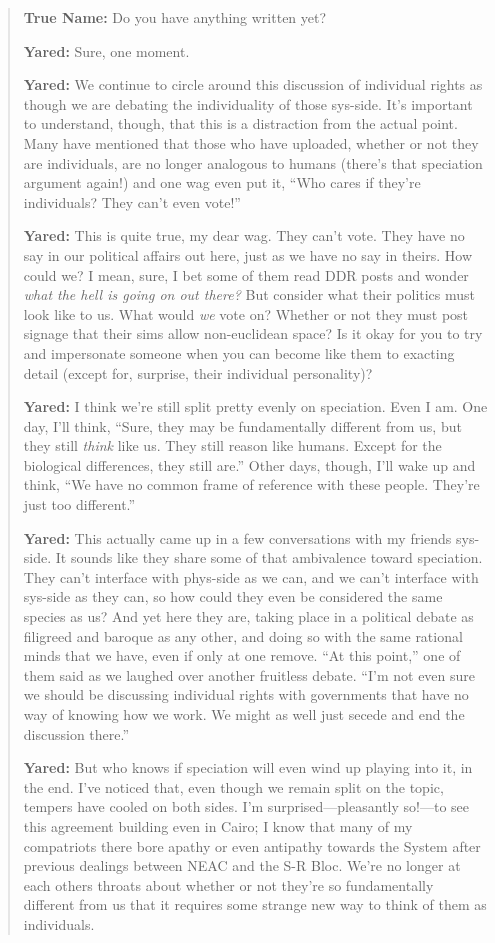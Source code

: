 \begin{quote}
\textbf{True Name:} Do you have anything written yet?

\textbf{Yared:} Sure, one moment.

\textbf{Yared:} We continue to circle around this discussion of individual rights as though we are debating the individuality of those sys-side. It's important to understand, though, that this is a distraction from the actual point. Many have mentioned that those who have uploaded, whether or not they are individuals, are no longer analogous to humans (there's that speciation argument again!) and one wag even put it, ``Who cares if they're individuals? They can't even vote!''

\textbf{Yared:} This is quite true, my dear wag. They can't vote. They have no say in our political affairs out here, just as we have no say in theirs. How could we? I mean, sure, I bet some of them read DDR posts and wonder \emph{what the hell is going on out there?} But consider what their politics must look like to us. What would \emph{we} vote on? Whether or not they must post signage that their sims allow non-euclidean space? Is it okay for you to try and impersonate someone when you can become like them to exacting detail (except for, surprise, their individual personality)?

\textbf{Yared:} I think we're still split pretty evenly on speciation. Even I am. One day, I'll think, ``Sure, they may be fundamentally different from us, but they still \emph{think} like us. They still reason like humans. Except for the biological differences, they still are.'' Other days, though, I'll wake up and think, ``We have no common frame of reference with these people. They're just too different.''

\textbf{Yared:} This actually came up in a few conversations with my friends sys-side. It sounds like they share some of that ambivalence toward speciation. They can't interface with phys-side as we can, and we can't interface with sys-side as they can, so how could they even be considered the same species as us? And yet here they are, taking place in a political debate as filigreed and baroque as any other, and doing so with the same rational minds that we have, even if only at one remove. ``At this point,'' one of them said as we laughed over another fruitless debate. ``I'm not even sure we should be discussing individual rights with governments that have no way of knowing how we work. We might as well just secede and end the discussion there.''

\textbf{Yared:} But who knows if speciation will even wind up playing into it, in the end. I've noticed that, even though we remain split on the topic, tempers have cooled on both sides. I'm surprised---pleasantly so!---to see this agreement building even in Cairo; I know that many of my compatriots there bore apathy or even antipathy towards the System after previous dealings between NEAC and the S-R Bloc. We're no longer at each others throats about whether or not they're so fundamentally different from us that it requires some strange new way to think of them as individuals.


\end{quote}
